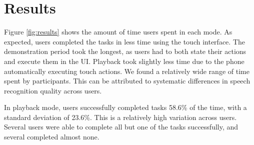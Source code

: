 \documentclass[letterpaper]{article}
\begin{document}



\section{Results}

Figure \ref{fig:results} shows the amount of time users spent in each mode. As expected, users completed the tasks in less time using the touch interface.
The demonstration period took the longest, as users had to both state their actions and execute them in the UI. Playback took slightly less time due to the
phone automatically executing touch actions. We found a relatively wide range of time spent by participants. This can be attributed to systematic
differences in speech recognition quality across users.

In playback mode, users successfully completed tasks 58.6\% of the time, with a standard deviation of 23.6\%. This is a relatively high variation across
users. Several users were able to complete all but one of the tasks successfully, and several completed almost none. 
\end{document}
